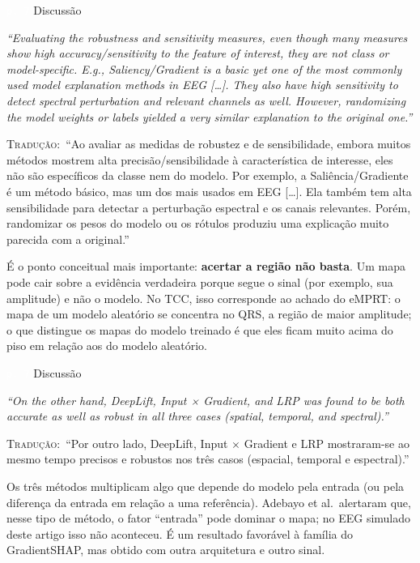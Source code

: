 \documentclass[11pt,a4paper]{article}
\newcommand{\pagechip}[1]{{\setlength{\fboxsep}{1.5pt}\colorbox{cAcc}{\textcolor{white}{\scriptsize\texttt{#1}}}}}
\newenvironment{origquote}{\par\itshape\small}{\par}
\newenvironment{tradquote}{\par\small\textsc{Tradução:}\ }{\par}
\newcommand{\explab}[1]{\par\smallskip{\small\color{cAcc}\textbf{\MakeUppercase{#1}}}\par}
\begin{document}
\begin{citacard}{\pagechip{p. 7} Discussão}
\begin{origquote}“Evaluating the robustness and sensitivity measures, even though many measures show high accuracy/sensitivity to the feature of interest, they are not class or model-specific. E.g., Saliency/Gradient is a basic yet one of the most commonly used model explanation methods in EEG [\ldots]. They also have high sensitivity to detect spectral perturbation and relevant channels as well. However, randomizing the model weights or labels yielded a very similar explanation to the original one.”\end{origquote}
\begin{tradquote}“Ao avaliar as medidas de robustez e de sensibilidade, embora muitos métodos mostrem alta precisão/sensibilidade à característica de interesse, eles não são específicos da classe nem do modelo. Por exemplo, a Saliência/Gradiente é um método básico, mas um dos mais usados em EEG [\ldots]. Ela também tem alta sensibilidade para detectar a perturbação espectral e os canais relevantes. Porém, randomizar os pesos do modelo ou os rótulos produziu uma explicação muito parecida com a original.”\end{tradquote}
\explab{Explicação}
É o ponto conceitual mais importante: \textbf{acertar a região não basta}. Um mapa pode cair sobre a evidência verdadeira porque segue o sinal (por exemplo, sua amplitude) e não o modelo. No TCC, isso corresponde ao achado do eMPRT: o mapa de um modelo aleatório se concentra no QRS, a região de maior amplitude; o que distingue os mapas do modelo treinado é que eles ficam muito acima do piso em relação aos do modelo aleatório.
\end{citacard}

\begin{citacard}{\pagechip{p. 7} Discussão}
\begin{origquote}“On the other hand, DeepLift, Input × Gradient, and LRP was found to be both accurate as well as robust in all three cases (spatial, temporal, and spectral).”\end{origquote}
\begin{tradquote}“Por outro lado, DeepLift, Input $\times$ Gradient e LRP mostraram-se ao mesmo tempo precisos e robustos nos três casos (espacial, temporal e espectral).”\end{tradquote}
\explab{Explicação}
Os três métodos multiplicam algo que depende do modelo pela entrada (ou pela diferença da entrada em relação a uma referência). Adebayo et al.\ alertaram que, nesse tipo de método, o fator “entrada” pode dominar o mapa; no EEG simulado deste artigo isso não aconteceu. É um resultado favorável à família do GradientSHAP, mas obtido com outra arquitetura e outro sinal.
\end{citacard}
\end{document}
